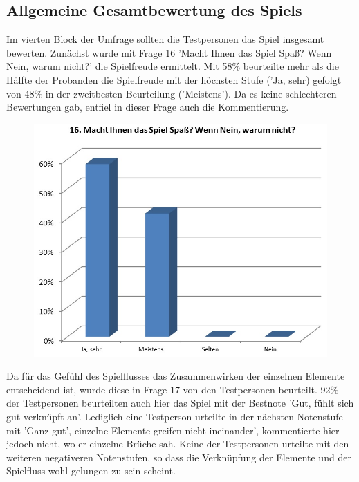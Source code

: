 \documentclass[extern,palatino]{cgBA}
\begin{document}
\subsection{Allgemeine Gesamtbewertung des Spiels}
Im vierten Block der Umfrage sollten die Testpersonen das Spiel insgesamt bewerten. Zunächst wurde mit Frage 16 'Macht Ihnen das Spiel Spaß? Wenn Nein, warum nicht?'  die Spielfreude ermittelt.  Mit 58\% beurteilte mehr als die Hälfte der Probanden die Spielfreude mit der höchsten Stufe ('Ja, sehr) gefolgt von 48\% in der zweitbesten Beurteilung ('Meistens'). Da es keine schlechteren Bewertungen gab, entfiel in dieser Frage auch die Kommentierung.
\begin{figure}[H]
	\centering
	\includegraphics[width=1\textwidth]{table13.jpg}
\end{figure}
Da für das Gefühl des Spielflusses das Zusammenwirken der einzelnen Elemente entscheidend ist, wurde diese in Frage 17 von den Testpersonen beurteilt. 92\% der Testpersonen beurteilten auch hier das Spiel mit der Bestnote 'Gut, fühlt sich gut verknüpft an'. Lediglich eine Testperson urteilte in der nächsten Notenstufe mit 'Ganz gut', einzelne Elemente  greifen nicht ineinander', kommentierte hier jedoch nicht, wo er einzelne Brüche sah. Keine der Testpersonen urteilte mit den weiteren negativeren Notenstufen, so dass die Verknüpfung der Elemente und der Spielfluss wohl gelungen zu sein scheint. 
\end{document}
